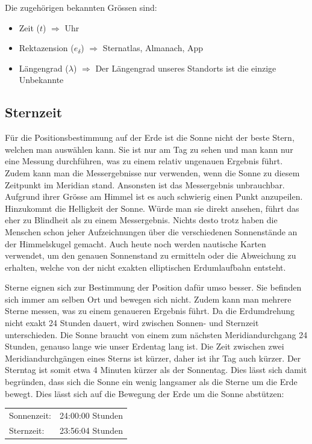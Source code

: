 \begin{refsection}
Die zugehörigen bekannten Grössen sind:
\begin{itemize}
\item Zeit ($t$) $\Rightarrow$ Uhr
\item Rektazension ($e_\delta$) $\Rightarrow$ Sternatlas, Almanach, App 
\item Längengrad ($\lambda$) $\Rightarrow$ Der Längengrad unseres
Standorts ist die einzige Unbekannte
\end{itemize}


\subsection{Sternzeit}
%
Für die Positionsbestimmung auf der Erde ist die Sonne nicht der
beste Stern, welchen man auswählen kann. Sie ist nur am Tag zu sehen
und man kann nur eine Messung durchführen, was zu einem relativ
ungenauen Ergebnis führt. Zudem kann man die Messergebnisse nur
verwenden, wenn die Sonne zu diesem Zeitpunkt im Meridian stand.
Ansonsten ist das Messergebnis unbrauchbar. Aufgrund ihrer Grösse
am Himmel ist es auch schwierig einen Punkt anzupeilen. Hinzukommt
die Helligkeit der Sonne. Würde man sie direkt ansehen, führt das
eher zu Blindheit als zu einem Messergebnis.
Nichts desto trotz haben die Menschen schon jeher Aufzeichnungen
über die verschiedenen Sonnenstände an der Himmelskugel gemacht.
Auch heute noch werden nautische Karten verwendet, um den genauen
Sonnenstand zu ermitteln oder die Abweichung zu erhalten, welche
von der nicht exakten elliptischen Erdumlaufbahn entsteht.

Sterne eignen sich zur Bestimmung der Position dafür umso besser.
Sie befinden sich immer am selben Ort und bewegen sich nicht. Zudem
kann man mehrere Sterne messen, was zu einem genaueren Ergebnis
führt. Da die Erdumdrehung nicht exakt 24 Stunden dauert, wird
zwischen Sonnen- und Sternzeit unterschieden. Die Sonne braucht von
einem zum nächsten Meridiandurchgang 24 Stunden, genauso lange wie
unser Erdentag lang ist. Die Zeit zwischen zwei Meridiandurchgängen
eines Sterns ist kürzer, daher ist ihr Tag auch kürzer. Der Sterntag
ist somit etwa 4 Minuten kürzer als der Sonnentag. Dies lässt sich
damit begründen, dass sich die Sonne ein wenig langsamer als die
Sterne um die Erde bewegt. Dies lässt sich auf die Bewegung der
Erde um die Sonne abstützen:
\begin{center}
\begin{tabular}{ll}
Sonnenzeit: & 24:00:00 Stunden \\
Sternzeit: & 23:56:04 Stunden
\end{tabular}
\end{center}


\end{refsection}
